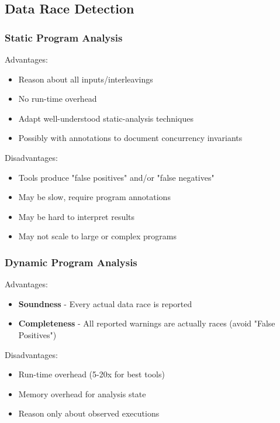 \subsection{Data Race Detection}

\subsubsection{Static Program Analysis}
Advantages:
\begin{itemize}
    \item Reason about all inputs/interleavings
    \item No run-time overhead
    \item Adapt well-understood static-analysis techniques
    \item Possibly with annotations to document concurrency invariants
\end{itemize}

Disadvantages:

\begin{itemize}
    \item Tools produce "false positives" and/or "false negatives"
    \item May be slow, require program annotations
    \item May be hard to interpret results
    \item May not scale to large or complex programs
\end{itemize}


\subsubsection{Dynamic Program Analysis}

Advantages:
\begin{itemize}
    \item \textbf{Soundness} - Every actual data race is reported
    \item \textbf{Completeness} - All reported warnings are actually races (avoid "False Positives")
\end{itemize}

Disadvantages:

\begin{itemize}
    \item Run-time overhead (5-20x for best tools)
    \item Memory overhead for analysis state
    \item Reason only about observed executions
\end{itemize}

